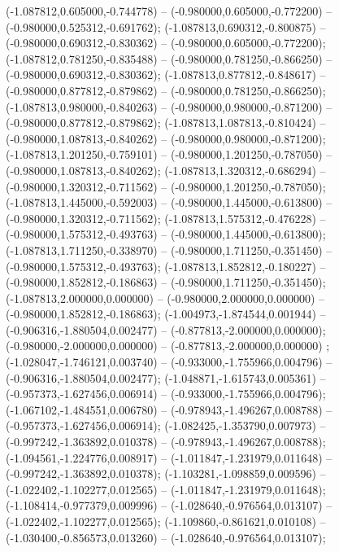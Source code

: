  (-1.087812,0.605000,-0.744778) -- (-0.980000,0.605000,-0.772200) -- (-0.980000,0.525312,-0.691762);
 (-1.087813,0.690312,-0.800875) -- (-0.980000,0.690312,-0.830362) -- (-0.980000,0.605000,-0.772200);
 (-1.087812,0.781250,-0.835488) -- (-0.980000,0.781250,-0.866250) -- (-0.980000,0.690312,-0.830362);
 (-1.087813,0.877812,-0.848617) -- (-0.980000,0.877812,-0.879862) -- (-0.980000,0.781250,-0.866250);
 (-1.087813,0.980000,-0.840263) -- (-0.980000,0.980000,-0.871200) -- (-0.980000,0.877812,-0.879862);
 (-1.087813,1.087813,-0.810424) -- (-0.980000,1.087813,-0.840262) -- (-0.980000,0.980000,-0.871200);
 (-1.087813,1.201250,-0.759101) -- (-0.980000,1.201250,-0.787050) -- (-0.980000,1.087813,-0.840262);
 (-1.087813,1.320312,-0.686294) -- (-0.980000,1.320312,-0.711562) -- (-0.980000,1.201250,-0.787050);
 (-1.087813,1.445000,-0.592003) -- (-0.980000,1.445000,-0.613800) -- (-0.980000,1.320312,-0.711562);
 (-1.087813,1.575312,-0.476228) -- (-0.980000,1.575312,-0.493763) -- (-0.980000,1.445000,-0.613800);
 (-1.087813,1.711250,-0.338970) -- (-0.980000,1.711250,-0.351450) -- (-0.980000,1.575312,-0.493763);
 (-1.087813,1.852812,-0.180227) -- (-0.980000,1.852812,-0.186863) -- (-0.980000,1.711250,-0.351450);
 (-1.087813,2.000000,0.000000) -- (-0.980000,2.000000,0.000000) -- (-0.980000,1.852812,-0.186863);
 (-1.004973,-1.874544,0.001944) -- (-0.906316,-1.880504,0.002477) -- (-0.877813,-2.000000,0.000000);
 (-0.980000,-2.000000,0.000000) -- (-0.877813,-2.000000,0.000000) ;
 (-1.028047,-1.746121,0.003740) -- (-0.933000,-1.755966,0.004796) -- (-0.906316,-1.880504,0.002477);
 (-1.048871,-1.615743,0.005361) -- (-0.957373,-1.627456,0.006914) -- (-0.933000,-1.755966,0.004796);
 (-1.067102,-1.484551,0.006780) -- (-0.978943,-1.496267,0.008788) -- (-0.957373,-1.627456,0.006914);
 (-1.082425,-1.353790,0.007973) -- (-0.997242,-1.363892,0.010378) -- (-0.978943,-1.496267,0.008788);
 (-1.094561,-1.224776,0.008917) -- (-1.011847,-1.231979,0.011648) -- (-0.997242,-1.363892,0.010378);
 (-1.103281,-1.098859,0.009596) -- (-1.022402,-1.102277,0.012565) -- (-1.011847,-1.231979,0.011648);
 (-1.108414,-0.977379,0.009996) -- (-1.028640,-0.976564,0.013107) -- (-1.022402,-1.102277,0.012565);
 (-1.109860,-0.861621,0.010108) -- (-1.030400,-0.856573,0.013260) -- (-1.028640,-0.976564,0.013107);

